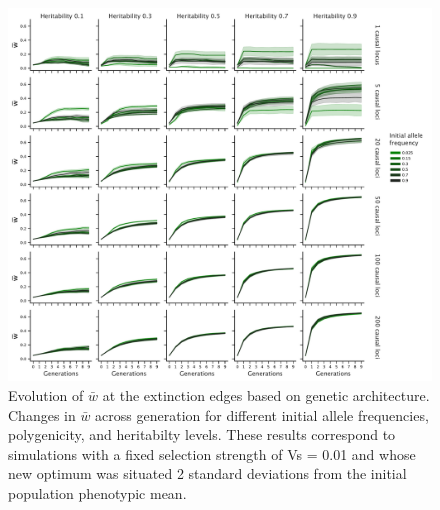\documentclass{article}
\begin{document}
\begin{figure}[H]
  \centering
  \includegraphics[width=1\textwidth]{figures/mean_fitness_acrossgen.pdf}
  \caption{Evolution of $\bar{w}$ at the extinction edges based on genetic architecture. Changes in $\bar{w}$ across generation for different initial allele frequencies, polygenicity, and heritabilty levels. These results correspond to simulations with a fixed selection strength of Vs = 0.01 and whose new optimum was situated 2 standard deviations from the initial population phenotypic mean.}
  \label{fig:mean_fitness_acrossgen}
\end{figure}
\end{document}
